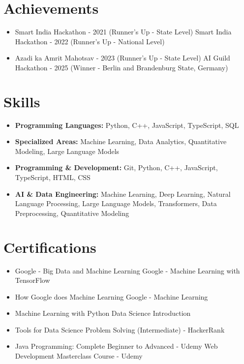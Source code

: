 \documentclass[a4paper,10pt]{article}
\begin{document}
\section*{Achievements}
\begin{itemize}
\item Smart India Hackathon - 2021 (Runner's Up - State Level) \hfill Smart India Hackathon - 2022 (Runner's Up - National Level)
\item Azadi ka Amrit Mahotsav - 2023 (Runner's Up - State Level) \hfill AI Guild Hackathon - 2025 (Winner - Berlin and Brandenburg State, Germany)
\end{itemize}

\section*{Skills}
\begin{itemize}
  \item \textbf{Programming Languages:} Python, C++, JavaScript, TypeScript, SQL
  \item \textbf{Specialized Areas:} Machine Learning, Data Analytics, Quantitative Modeling, Large Language Models
  \item \textbf{Programming \& Development:} Git, Python, C++, JavaScript, TypeScript, HTML, CSS
  \item \textbf{AI \& Data Engineering:} Machine Learning, Deep Learning, Natural Language Processing, Large Language Models, Transformers, Data Preprocessing, Quantitative Modeling
\end{itemize}

\section*{Certifications}
\begin{itemize}
\item Google - Big Data and Machine Learning \hfill Google - Machine Learning with TensorFlow
\item How Google does Machine Learning \hfill Google - Machine Learning
\item Machine Learning with Python \hfill Data Science Introduction
\item Tools for Data Science \hfill Problem Solving (Intermediate) - HackerRank
\item Java Programming: Complete Beginner to Advanced - Udemy \hfill Web Development Masterclass Course - Udemy
\end{itemize}
\end{document}
